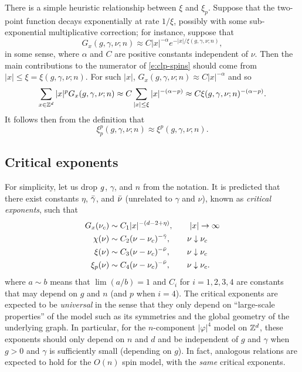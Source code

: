 \begin{rk}
There is a simple heuristic relationship between $\xi$ and $\xi_p$. Suppose that
the two-point function decays exponentially at rate $1/\xi$, possibly with some
sub-exponential multiplicative correction; for instance, suppose that
\begin{equation}
G_x(g, \gamma, \nu; n) \approx C |x|^{-\alpha} e^{-|x|/\xi(g, \gamma, \nu; n)},
\end{equation}
in some sense, where $\alpha$ and $C$ are positive constants independent of $\nu$.
Then the main contributions to the numerator of
\eqref{e:clp-spins} should come from $|x| \le \xi = \xi(g, \gamma, \nu; n)$. For such $|x|$,
$G_x(g, \gamma, \nu; n) \approx C |x|^{-\alpha}$ and so
\begin{equation}
\sum_{x\in{ {{\mathbb Z}}^d }} |x|^p G_x(g, \gamma, \nu; n)
	\approx
C \sum_{|x| \le \xi} |x|^{-(\alpha-p)}
	\approx
C \xi(g, \gamma, \nu; n)^{-(\alpha-p)}.
\end{equation}
It follows then from the definition that
\begin{equation}
\xi^p_p(g, \gamma, \nu; n) \approx \xi^p(g, \gamma, \nu; n).
\end{equation}
\end{rk}


\subsection{Critical exponents}

For simplicity, let us drop $g$, $\gamma$, and $n$ from the notation.
It is predicted that there exist constants $\eta$, $\bar\gamma$, and $\bar\nu$
(unrelated to $\gamma$ and $\nu$), known as \emph{critical exponents}, such that
\begin{align}
\label{e:Gpred}
G_x(\nu_c)
	&\sim
C_1 |x|^{-(d - 2 + \eta)},
	\qquad
|x|\rightarrow\infty \\
\chi(\nu)
	&\sim
C_2 (\nu - \nu_c)^{-\bar\gamma},
	\qquad
\nu\downarrow\nu_c \\
\xi(\nu)
	&\sim
C_3 (\nu - \nu_c)^{-\bar\nu},
	\qquad
\nu\downarrow\nu_c \\
\label{e:xippred}
\xi_p(\nu)
	&\sim
C_4 (\nu - \nu_c)^{-\bar\nu},
	\qquad
\nu\downarrow\nu_c.
\end{align}
where $a \sim b$ means that $\lim (a/b) = 1$ and $C_i$ for $i = 1,2,3,4$
are constants that may depend on $g$ and $n$ (and $p$ when $i = 4$).
The critical exponents are expected to be \emph{universal} in the sense that they
only depend on ``large-scale properties'' of the model such as its symmetries and
the global geometry of the underlying graph. In particular,
for the $n$-component $|\varphi|^4$ model on ${ {{\mathbb Z}}^d }$, these exponents should only
depend on $n$ and $d$ and be independent of $g$ and $\gamma$ when $g > 0$ and $\gamma$
is sufficiently small (depending on $g$). In fact,
analogous relations are expected to hold for the $O(n)$ spin model, with the
\emph{same} critical exponents.

